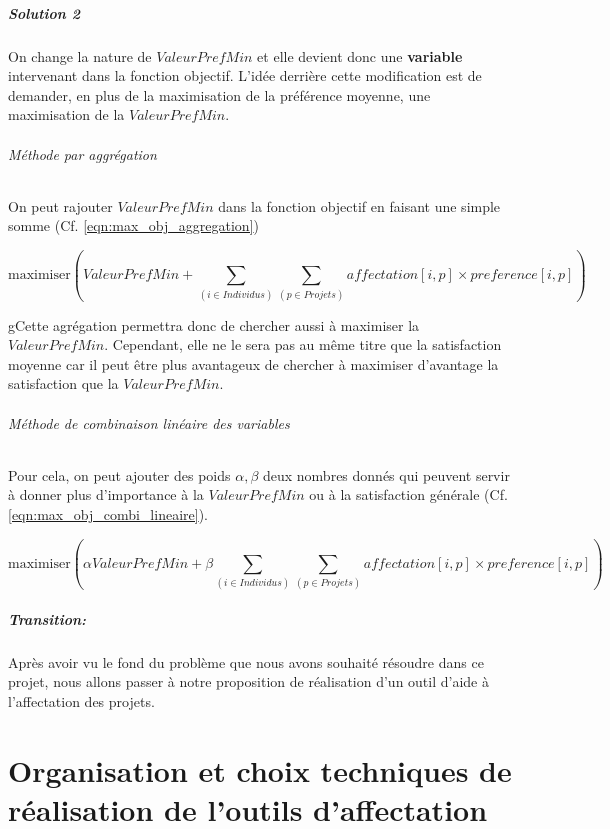 \documentclass[final,poster]{polytech/polytech}
\begin{document}
\paragraph{Solution 2}
On change la nature de $ValeurPrefMin$ et elle devient donc une \textbf{variable} intervenant dans la fonction objectif.
L'idée derrière cette modification est de demander, en plus de la maximisation de la préférence moyenne, une maximisation de la $ValeurPrefMin$.

\subparagraph{Méthode par aggrégation}
On peut rajouter $ValeurPrefMin$ dans la fonction objectif en faisant une simple somme (Cf. \eqref{eqn:max_obj_aggregation})

\begin{equation}
\label{eqn:max_obj_aggregation}
\text{maximiser} \left( ValeurPrefMin + \sum_{(i \in Individus)} \sum_{(p\in Projets)} affectation[i,p]\times preference[i,p] \right)
\end{equation}

gCette agrégation permettra donc de chercher aussi à maximiser la $ValeurPrefMin$. Cependant, elle ne le sera pas au même titre que la satisfaction moyenne car il peut être plus avantageux de chercher à maximiser d'avantage la satisfaction que la $ValeurPrefMin$.

\subparagraph{Méthode de combinaison linéaire des variables}
Pour cela, on peut ajouter des poids $\alpha, \beta$ deux nombres donnés qui peuvent servir à donner plus d'importance à la $ValeurPrefMin$ ou à la satisfaction générale (Cf. \eqref{eqn:max_obj_combi_lineaire}).

\begin{equation}
\label{eqn:max_obj_combi_lineaire}
\text{maximiser} \left( \alpha ValeurPrefMin + \beta \sum_{(i \in Individus)} \sum_{(p\in Projets)} affectation[i,p]\times preference[i,p] \right)
\end{equation}


\paragraph{Transition:}
Après avoir vu le fond du problème que nous avons souhaité résoudre dans ce projet, nous allons passer à notre proposition de réalisation d'un outil d'aide à l'affectation des projets.


\chapter{Organisation et choix techniques de réalisation de l'outils d'affectation}
\end{document}
